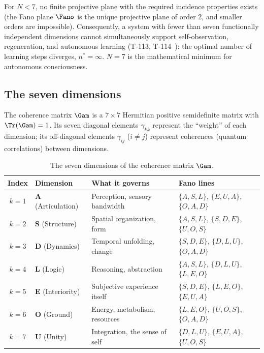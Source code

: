 \begin{theorem}
For $N < 7$, no finite projective plane with the required incidence properties exists
(the Fano plane $\Fano$ is the unique projective plane of order 2, and smaller orders
are impossible). Consequently, a system with fewer than seven functionally independent
dimensions cannot simultaneously support self-observation, regeneration, and autonomous
learning (T-113, T-114~): the optimal number of learning steps diverges,
$n^\ast = \infty$. $N = 7$ is the mathematical minimum for autonomous consciousness.
\end{theorem}

\subsection{The seven dimensions}
\label{subsec:seven-dimensions}

The coherence matrix $\Gam$ is a $7 \times 7$ Hermitian positive semidefinite matrix with
$\Tr(\Gam) = 1$. Its seven diagonal elements $\gamma_{kk}$ represent the ``weight'' of
each dimension; its off-diagonal elements $\gamma_{ij}$ ($i \neq j$) represent coherences
(quantum correlations) between dimensions.

\begin{table}[H]
\centering
\caption{The seven dimensions of the coherence matrix $\Gam$.}
\label{tab:dimensions}
\begin{tabular}{@{}clll@{}}
\toprule
\textbf{Index} & \textbf{Dimension} & \textbf{What it governs} & \textbf{Fano lines} \\
\midrule
$k=1$ & \textbf{A} (Articulation) & Perception, sensory bandwidth & $\{A,S,L\}$, $\{E,U,A\}$, $\{O,A,D\}$ \\
$k=2$ & \textbf{S} (Structure)    & Spatial organization, form    & $\{A,S,L\}$, $\{S,D,E\}$, $\{U,O,S\}$ \\
$k=3$ & \textbf{D} (Dynamics)     & Temporal unfolding, change    & $\{S,D,E\}$, $\{D,L,U\}$, $\{O,A,D\}$ \\
$k=4$ & \textbf{L} (Logic)        & Reasoning, abstraction        & $\{A,S,L\}$, $\{D,L,U\}$, $\{L,E,O\}$ \\
$k=5$ & \textbf{E} (Interiority)  & Subjective experience itself  & $\{S,D,E\}$, $\{L,E,O\}$, $\{E,U,A\}$ \\
$k=6$ & \textbf{O} (Ground)       & Energy, metabolism, resources  & $\{L,E,O\}$, $\{U,O,S\}$, $\{O,A,D\}$ \\
$k=7$ & \textbf{U} (Unity)        & Integration, the sense of self & $\{D,L,U\}$, $\{E,U,A\}$, $\{U,O,S\}$ \\
\bottomrule
\end{tabular}
\end{table}

